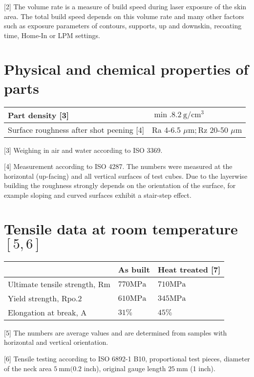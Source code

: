 \documentclass[10pt]{article}
\begin{document}
[2] The volume rate is a measure of build speed during laser exposure of the skin area. The total build speed depends on this volume rate and many other factors such as exposure parameters of contours, supports, up and downskin, recoating time, Home-In or LPM settings.

\section*{Physical and chemical properties of parts}
\begin{center}
\begin{tabular}{ll}
\hline
Part density [3] & $\min .8 .2 \mathrm{~g} / \mathrm{cm}^{3}$ \\
\hline
Surface roughness after shot peening [4] & Ra 4-6.5 $\mu \mathrm{m} ; \mathrm{Rz}$ 20-50 $\mu \mathrm{m}$ \\
\hline
\end{tabular}
\end{center}

[3] Weighing in air and water according to ISO 3369.

[4] Measurement according to ISO 4287. The numbers were measured at the horizontal (up-facing) and all vertical surfaces of test cubes. Due to the layerwise building the roughness strongly depends on the orientation of the surface, for example sloping and curved surfaces exhibit a stair-step effect.

\section*{Tensile data at room temperature $[5,6]$}
\begin{center}
\begin{tabular}{lll}
\hline
 & As built & Heat treated [7] \\
\hline
Ultimate tensile strength, Rm & $770 \mathrm{MPa}$ & $710 \mathrm{MPa}$ \\
\hline
Yield strength, Rpo.2 & $610 \mathrm{MPa}$ & $345 \mathrm{MPa}$ \\
\hline
Elongation at break, A & $31 \%$ & $45 \%$ \\
\hline
\end{tabular}
\end{center}

[5] The numbers are average values and are determined from samples with horizontal and vertical orientation.

[6] Tensile testing according to ISO 6892-1 B10, proportional test pieces, diameter of the neck area $5 \mathrm{~mm}(0.2$ inch), original gauge length $25 \mathrm{~mm}$ (1 inch).
\end{document}
